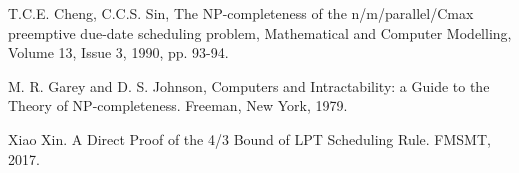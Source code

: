  
\begin{thebibliography}{}
      T.C.E. Cheng, C.C.S. Sin, The NP-completeness of the n/m/parallel/Cmax preemptive due-date scheduling problem, Mathematical and Computer Modelling, Volume 13, Issue 3, 1990, pp. 93-94.

      M. R. Garey and D. S. Johnson, Computers and Intractability: a Guide to the Theory of NP-completeness. Freeman, New York, 1979.
    
    
      Xiao Xin. A Direct Proof of the 4/3 Bound of LPT Scheduling Rule. FMSMT, 2017.

\end{thebibliography}